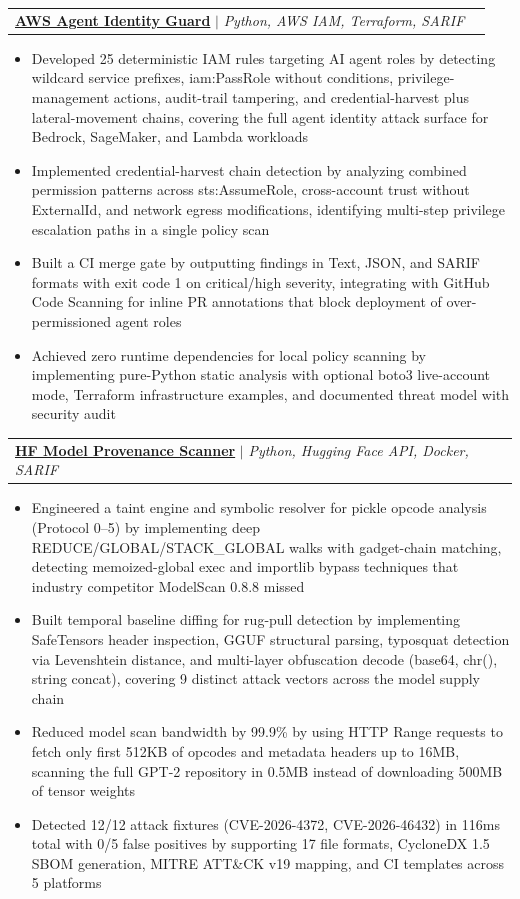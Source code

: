 \documentclass[letterpaper,11pt]{article}
\makeatletter
\newcommand{\resumeItem}[1]{
  \item\small{
    {#1 \vspace{-2pt}}
  }
}
\newcommand{\resumeProjectHeading}[2]{
    \item
    \begin{tabular*}{0.97\textwidth}{l@{\extracolsep{\fill}}r}
      \small#1 & #2 \\
    \end{tabular*}\vspace{-7pt}
}
\newcommand{\resumeItemListStart}{\begin{itemize}}
\newcommand{\resumeItemListEnd}{\end{itemize}\vspace{-5pt}}
\makeatother
\begin{document}
      \resumeProjectHeading
          {\textbf{\href{https://github.com/poojakira/aws-agent-identity-guard}{AWS Agent Identity Guard}} $|$ \emph{Python, AWS IAM, Terraform, SARIF}}{}
          \resumeItemListStart
            \resumeItem{Developed 25 deterministic IAM rules targeting AI agent roles by detecting wildcard service prefixes, iam:PassRole without conditions, privilege-management actions, audit-trail tampering, and credential-harvest plus lateral-movement chains, covering the full agent identity attack surface for Bedrock, SageMaker, and Lambda workloads}
            \resumeItem{Implemented credential-harvest chain detection by analyzing combined permission patterns across sts:AssumeRole, cross-account trust without ExternalId, and network egress modifications, identifying multi-step privilege escalation paths in a single policy scan}
            \resumeItem{Built a CI merge gate by outputting findings in Text, JSON, and SARIF formats with exit code 1 on critical/high severity, integrating with GitHub Code Scanning for inline PR annotations that block deployment of over-permissioned agent roles}
            \resumeItem{Achieved zero runtime dependencies for local policy scanning by implementing pure-Python static analysis with optional boto3 live-account mode, Terraform infrastructure examples, and documented threat model with security audit}
          \resumeItemListEnd

      \resumeProjectHeading
          {\textbf{\href{https://github.com/poojakira/hf-model-provenance-scanner}{HF Model Provenance Scanner}} $|$ \emph{Python, Hugging Face API, Docker, SARIF}}{}
          \resumeItemListStart
            \resumeItem{Engineered a taint engine and symbolic resolver for pickle opcode analysis (Protocol 0--5) by implementing deep REDUCE/GLOBAL/STACK\_GLOBAL walks with gadget-chain matching, detecting memoized-global exec and importlib bypass techniques that industry competitor ModelScan 0.8.8 missed}
            \resumeItem{Built temporal baseline diffing for rug-pull detection by implementing SafeTensors header inspection, GGUF structural parsing, typosquat detection via Levenshtein distance, and multi-layer obfuscation decode (base64, chr(), string concat), covering 9 distinct attack vectors across the model supply chain}
            \resumeItem{Reduced model scan bandwidth by 99.9\% by using HTTP Range requests to fetch only first 512KB of opcodes and metadata headers up to 16MB, scanning the full GPT-2 repository in 0.5MB instead of downloading 500MB of tensor weights}
            \resumeItem{Detected 12/12 attack fixtures (CVE-2026-4372, CVE-2026-46432) in 116ms total with 0/5 false positives by supporting 17 file formats, CycloneDX 1.5 SBOM generation, MITRE ATT\&CK v19 mapping, and CI templates across 5 platforms}
          \resumeItemListEnd
\end{document}
